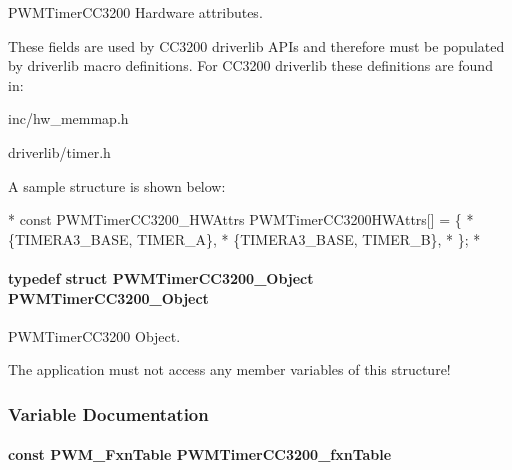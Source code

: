 P\-W\-M\-Timer\-C\-C3200 Hardware attributes. 

These fields are used by C\-C3200 driverlib A\-P\-Is and therefore must be populated by driverlib macro definitions. For C\-C3200 driverlib these definitions are found in\-:
\begin{DoxyItemize}
\item inc/hw\-\_\-memmap.\-h
\item driverlib/timer.\-h
\end{DoxyItemize}

A sample structure is shown below\-: 
\begin{DoxyCode}
*  \textcolor{keyword}{const} PWMTimerCC3200_HWAttrs PWMTimerCC3200HWAttrs[] = \{
*      \{TIMERA3\_BASE, TIMER\_A\},
*      \{TIMERA3\_BASE, TIMER\_B\},
*  \};
*  
\end{DoxyCode}
\paragraph[{P\-W\-M\-Timer\-C\-C3200\-\_\-\-Object}]{\setlength{\rightskip}{0pt plus 5cm}typedef struct {\bf P\-W\-M\-Timer\-C\-C3200\-\_\-\-Object}  {\bf P\-W\-M\-Timer\-C\-C3200\-\_\-\-Object}}\label{_p_w_m_timer_c_c3200_8h_aab5de96f9cb61cd9fad8c91c02fb591a}


P\-W\-M\-Timer\-C\-C3200 Object. 

The application must not access any member variables of this structure! 

\subsubsection{Variable Documentation}
\paragraph[{P\-W\-M\-Timer\-C\-C3200\-\_\-fxn\-Table}]{\setlength{\rightskip}{0pt plus 5cm}const {\bf P\-W\-M\-\_\-\-Fxn\-Table} P\-W\-M\-Timer\-C\-C3200\-\_\-fxn\-Table}\label{_p_w_m_timer_c_c3200_8h_a59acce71ed10f39839edb1a310c6b385}
